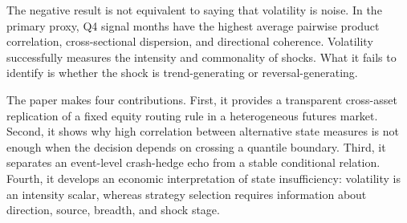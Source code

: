 The negative result is not equivalent to saying that volatility is noise. In the primary
proxy, Q4 signal months have the highest average pairwise product correlation,
cross-sectional dispersion, and directional coherence. Volatility successfully measures
the intensity and commonality of shocks. What it fails to identify is whether the shock
is trend-generating or reversal-generating.

The paper makes four contributions. First, it provides a transparent cross-asset
replication of a fixed equity routing rule in a heterogeneous futures market. Second, it
shows why high correlation between alternative state measures is not enough when the
decision depends on crossing a quantile boundary. Third, it separates an event-level
crash-hedge echo from a stable conditional relation. Fourth, it develops an economic
interpretation of state insufficiency: volatility is an intensity scalar, whereas
strategy selection requires information about direction, source, breadth, and shock
stage.
